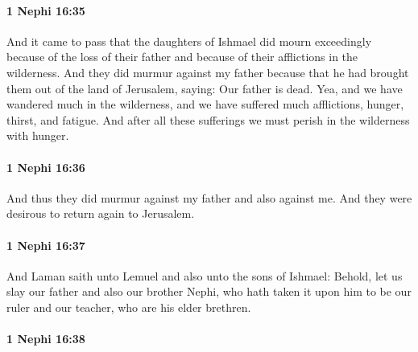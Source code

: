 		\paragraph{1 Nephi 16:35} %
			\label{1NEPHI-16-35}

			And it came to pass that the daughters of Ishmael did mourn exceedingly
			because of the loss of their father
			and because of their afflictions in the wilderness.
			And they did murmur against my father
			because that he had brought them out of the land of Jerusalem, saying:
			Our father is dead.
			Yea, and we have wandered much in the wilderness,
			and we have suffered much afflictions, hunger, thirst, and fatigue.
			And after all these sufferings we must perish in the wilderness with hunger.

		\paragraph{1 Nephi 16:36} %
			\label{1NEPHI-16-36}

			And thus they did murmur against my father and also against me.
			And they were desirous to return again to Jerusalem.

		\paragraph{1 Nephi 16:37} %
			\label{1NEPHI-16-37}

			And Laman saith unto Lemuel and also unto the sons of Ishmael:
			Behold, let us slay our father and also our brother Nephi,
			who hath taken it upon him to be our ruler and our teacher,
			who are his elder brethren.

		\paragraph{1 Nephi 16:38} %
			\label{1NEPHI-16-38}

